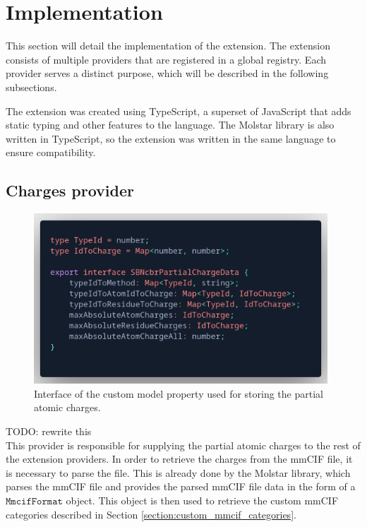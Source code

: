 \documentclass[
  digital,     %
  oneside,     %
  nosansbold,  %
  nocolorbold, %
  lof,         %
  lot,         %
]{fithesis4}
\begin{document}
\section{Implementation}
\label{section:implementation}

This section will detail the implementation of the extension. The extension consists of multiple providers that are registered in a global registry. Each provider serves a distinct purpose, which will be described in the following subsections.

The extension was created using TypeScript, a superset of JavaScript that adds static typing and other features to the language. The Molstar library is also written in TypeScript, so the extension was written in the same language to ensure compatibility.

\subsection{Charges provider}
\label{subsection:charges_provider}

\begin{figure}
  \begin{center}
    \includegraphics[width=11cm]{figures/charge_data_structure.png}
  \end{center}
  \caption{Interface of the custom model property used for storing the partial atomic charges.}
  \label{figure:charge_data_structure}
\end{figure}

TODO: rewrite this \\

This provider is responsible for supplying the partial atomic charges to the rest of the extension providers. In order to retrieve the charges from the mmCIF file, it is necessary to parse the file. This is already done by the Molstar library, which parses the mmCIF file and provides the parsed mmCIF file data in the form of a $\texttt{MmcifFormat}$ object. This object is then used to retrieve the custom mmCIF categories described in Section \ref{section:custom_mmcif_categories}.
\end{document}
